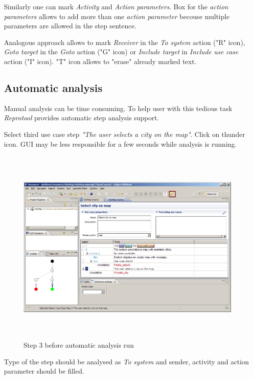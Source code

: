 Similarly one can mark \emph{Activity} and \emph{Action parameters}. Box for the \emph{action parameters} allows to add more than one \emph{action parameter} becouse multiple parameters are
allowed in the step sentence. 

Analogous approach allows to mark \emph{Receiver} in the \emph{To system} action ("R" icon), \emph{Goto target} in the \emph{Goto} action ("G" icon) or \emph{Include target} in \emph{Include use case} action ("I" icon). "T" icon allows to "erase" already marked text.

\subsection{Automatic analysis}

Manual analysis can be time consuming. To help user with this tedious task \emph{Reprotool} provides automatic step analysis support.

Select third use case step \emph{"The user selects a city on the map"}. Click on thunder icon.
GUI may be less responsible for a few seconds while analysis is running.

\begin{figure}[ht]
  \centering
  \includegraphics[height=280pt]{images/manual-analysis/step3-automatic-before}
  \caption{Step 3 before automatic analysis run}
\end{figure}

Type of the step should be analysed as \emph{To system} and sender, activity and action parameter
should be filled.

